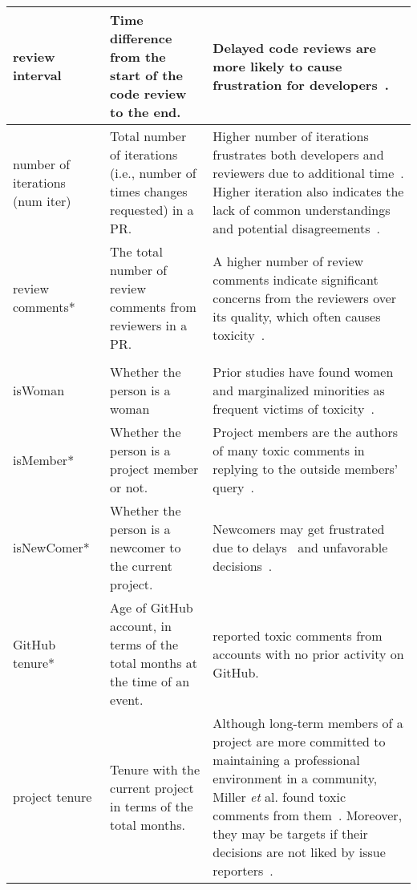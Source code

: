 {\begin{tabular}{|p{1.9cm}|p{5.5cm}|p{11.2cm}|}
review interval & Time difference from the start of the code review to the end. & Delayed code reviews are more likely to cause frustration for developers~\cite{egelman2020predicting,turzo2023makes}.     \\  \hline

number of iterations (num iter)  & Total number of iterations (i.e., number of times changes requested) in a PR. &  Higher number of iterations frustrates both developers and reviewers due to additional time~\cite{turzo2023makes}. Higher iteration also indicates the lack of common understandings~\cite{ebert2019confusion} and potential disagreements~\cite{murphy2022pushback}.   \\  \hline

review comments* & The total number of review comments from reviewers in a PR.  & %
A higher number of review comments indicate significant concerns from the reviewers over its quality, which often causes toxicity~\cite{rahman2024words}.\\  \hline




\rowcolor[gray]{.8}
\multicolumn{3}{l}{ \textbf{RQ4: Participants}}\\ \hline

isWoman& Whether the person is a woman & Prior studies have found women and marginalized minorities as frequent victims of toxicity~\cite{raman2020stress, gunawardena2022destructive}.
    \\  \hline

 

isMember* & Whether the person is a project member or not. & Project members are the authors of many toxic comments in replying to the outside members' query~\cite{cohen2021contextualizing, miller2022did}.  \\  \hline



 isNewComer* & Whether the person is a newcomer to the current project. & Newcomers may get frustrated due to delays~\cite{steinmacher2013newcomers} and unfavorable decisions~\cite{ferreira2021shut}. \\  \hline 

 GitHub tenure* & Age of GitHub account, in terms of the {total} months at the time of an event. & \cite{miller2022did} reported toxic comments from accounts with no prior activity on GitHub. \\  \hline  

  project tenure & Tenure with the current project in terms of the {total} months. & Although long-term members of a project are more committed to maintaining a professional environment in a community, Miller \textit{et} al. found toxic comments from them~\cite{miller2022did}. Moreover,  they may be targets if their decisions are not liked by issue reporters~\cite{ferreira2022heated}.   \\  \hline 


\end{tabular}}
